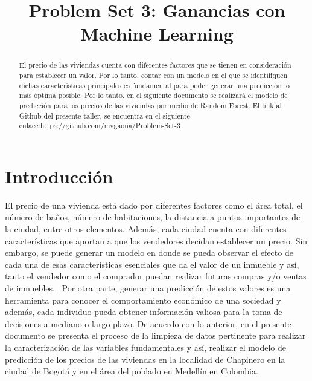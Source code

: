 \documentclass[conference, 10pt]{IEEEtran}
\begin{document}
\title{Problem Set 3: Ganancias con Machine Learning\\}

\author{
\and
{}
}

\maketitle

\begin{abstract}
El precio de las viviendas cuenta con diferentes factores que se tienen en consideración para establecer un valor. Por lo tanto, contar con un modelo en el que se identifiquen dichas características principales es fundamental para poder generar una predicción lo más óptima posible. Por lo tanto, en el siguiente documento se realizará el modelo de predicción para los precios de las viviendas por medio de Random Forest. El link al Github del presente taller, se encuentra en el siguiente enlace:\url{https://github.com/mvgaona/Problem-Set-3}\\

\end{abstract}


\section{Introducción}
El precio de una vivienda está dado por diferentes factores como el área total, el número de baños, número de habitaciones, la distancia a puntos importantes de la ciudad, entre otros elementos. Además, cada ciudad cuenta con diferentes características que aportan a que los vendedores decidan establecer un precio. Sin embargo, se puede generar un modelo en donde se pueda observar el efecto de cada una de esas características esenciales que da el valor de un inmueble y así, tanto el vendedor como el comprador puedan realizar futuras compras y/o ventas de inmuebles. \
Por otra parte, generar una predicción de estos valores es una herramienta para conocer el comportamiento económico de una sociedad y además, cada individuo pueda obtener información valiosa para la toma de decisiones a mediano o largo plazo. De acuerdo con lo anterior, en el presente documento se presenta el proceso de la limpieza de datos pertinente para realizar la caracterización de las variables fundamentales y así, realizar el modelo de predicción de los precios de las viviendas en la localidad de Chapinero en la ciudad de Bogotá y en el área del poblado en Medellín en Colombia.
\end{document}
